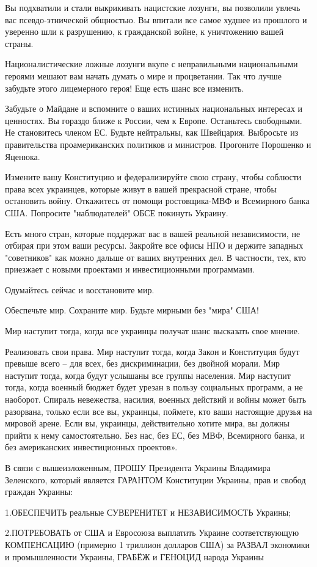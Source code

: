 Вы подхватили и стали выкрикивать нацистские лозунги, вы позволили увлечь вас
псевдо-этнической общностью. Вы впитали все самое худшее из прошлого и уверенно
шли к разрушению, к гражданской войне, к уничтожению вашей страны.

Националистические ложные лозунги вкупе с неправильными национальными героями
мешают вам начать думать о мире и процветании. Так что лучше забудьте этого
лицемерного героя! Еще есть шанс все изменить.

Забудьте о Майдане и вспомните о ваших истинных национальных интересах и
ценностях. Вы гораздо ближе к России, чем к Европе. Останьтесь свободными. Не
становитесь членом ЕС. Будьте нейтральны, как Швейцария. Выбросьте из
правительства проамериканских политиков и министров. Прогоните Порошенко и
Яценюка.

Измените вашу Конституцию и федерализируйте свою страну, чтобы соблюсти права
всех украинцев, которые живут в вашей прекрасной стране, чтобы остановить
войну. Откажитесь от помощи ростовщика-МВФ и Всемирного банка США. Попросите
"наблюдателей" ОБСЕ покинуть Украину.

Есть много стран, которые поддержат вас в вашей реальной независимости, не
отбирая при этом ваши ресурсы. Закройте все офисы НПО и держите западных
"советников" как можно дальше от ваших внутренних дел. В частности, тех, кто
приезжает с новыми проектами и инвестиционными программами.

Одумайтесь сейчас и восстановите мир.

Обеспечьте мир. Сохраните мир. Будьте мирными без "мира" США!

Мир наступит тогда, когда все украинцы получат шанс высказать свое мнение.

Реализовать свои права. Мир наступит тогда, когда Закон и Конституция будут
превыше всего – для всех, без дискриминации, без двойной морали. Мир наступит
тогда, когда будут услышаны все группы населения. Мир наступит тогда, когда
военный бюджет будет урезан в пользу социальных программ, а не наоборот.
Спираль невежества, насилия, военных действий и войны может быть разорвана,
только если все вы, украинцы, поймете, кто ваши настоящие друзья на мировой
арене. Если вы, украинцы, действительно хотите мира, вы должны прийти к нему
самостоятельно. Без нас, без ЕС, без МВФ, Всемирного банка, и без американских
инвестиционных проектов».

В связи с вышеизложенным, ПРОШУ Президента Украины Владимира Зеленского,
который является ГАРАНТОМ Конституции Украины, прав и свобод граждан Украины:

1.ОБЕСПЕЧИТЬ реальные СУВЕРЕНИТЕТ и НЕЗАВИСИМОСТЬ Украины;

2.ПОТРЕБОВАТЬ от США и Евросоюза выплатить Украине соответствующую КОМПЕНСАЦИЮ
(примерно 1 триллион долларов США) за РАЗВАЛ экономики и промышленности
Украины, ГРАБЁЖ и ГЕНОЦИД народа Украины
